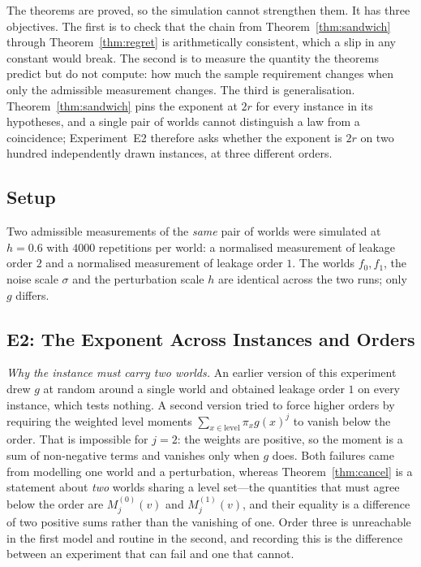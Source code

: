 \documentclass[conference]{IEEEtran}
\theoremstyle{definition}
\begin{document}
The theorems are proved, so the simulation cannot strengthen them. It has three objectives.
The first is to check that the chain from Theorem~\ref{thm:sandwich} through
Theorem~\ref{thm:regret} is arithmetically consistent, which a slip in any constant would
break. The second is to measure the quantity the theorems predict but do not compute: how
much the sample requirement changes when only the admissible measurement changes. The third
is generalisation. Theorem~\ref{thm:sandwich} pins the exponent at $2r$ for every instance in
its hypotheses, and a single pair of worlds cannot distinguish a law from a coincidence;
Experiment~E2 therefore asks whether the exponent is $2r$ on two hundred independently drawn
instances, at three different orders.

\subsection{Setup}

Two admissible measurements of the \emph{same} pair of worlds were simulated at $h=0.6$ with
$4000$ repetitions per world: a normalised measurement of leakage order $2$ and a normalised
measurement of leakage order $1$. The worlds $f_{0},f_{1}$, the noise scale $\sigma$ and the
perturbation scale $h$ are identical across the two runs; only $g$ differs.

\subsection{E2: The Exponent Across Instances and Orders}
\label{sec:e2}

\emph{Why the instance must carry two worlds.} An earlier version of this experiment drew $g$
at random around a single world and obtained leakage order $1$ on every instance, which tests
nothing. A second version tried to force higher orders by requiring the weighted level moments
$\sum_{x\in\text{level}}\pi_{x}g(x)^{j}$ to vanish below the order. That is impossible for
$j=2$: the weights are positive, so the moment is a sum of non-negative terms and vanishes
only when $g$ does. Both failures came from modelling one world and a perturbation, whereas
Theorem~\ref{thm:cancel} is a statement about \emph{two} worlds sharing a level set---the
quantities that must agree below the order are $M^{(0)}_{j}(v)$ and $M^{(1)}_{j}(v)$, and
their equality is a difference of two positive sums rather than the vanishing of one. Order
three is unreachable in the first model and routine in the second, and recording this is the
difference between an experiment that can fail and one that cannot.
\end{document}
